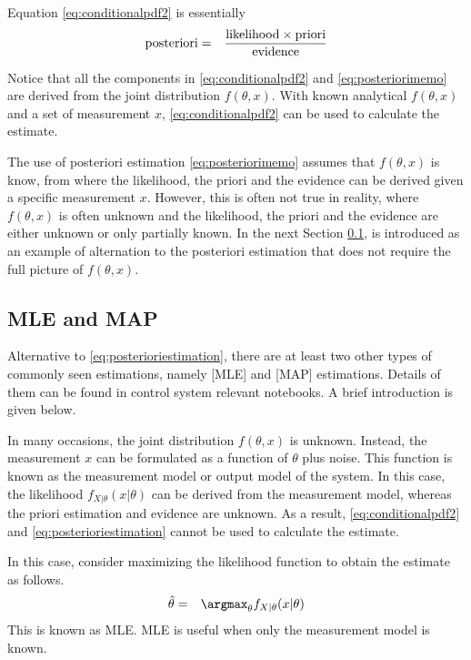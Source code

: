 Equation \eqref{eq:conditionalpdf2} is essentially
\begin{eqnarray}
	\textup{posteriori} &=& \dfrac{\textup{likelihood}\times\textup{priori}}{\textup{evidence}} \label{eq:posteriorimemo}
\end{eqnarray} 

Notice that all the components in \eqref{eq:conditionalpdf2} and \eqref{eq:posteriorimemo} are derived from the joint distribution $f(\theta, x)$. With known analytical $f(\theta, x)$ and a set of measurement $x$, \eqref{eq:conditionalpdf2} can be used to calculate the estimate. 

The use of posteriori estimation \eqref{eq:posteriorimemo} assumes that $f(\theta, x)$ is know, from where the likelihood, the priori and the evidence can be derived given a specific measurement $x$. However, this is often not true in reality, where $f(\theta, x)$ is often unknown and the likelihood, the priori and the evidence are either unknown or only partially known. In the next Section \ref{sec:mlemap},  is introduced as an example of alternation to the posteriori estimation that does not require the full picture of $f(\theta, x)$.

\subsection{MLE and MAP} \label{sec:mlemap}

Alternative to \eqref{eq:posterioriestimation}, there are at least two other types of commonly seen estimations, namely [MLE] and [MAP] estimations. Details of them can be found in control system relevant notebooks. A brief introduction is given below.

In many occasions, the joint distribution $f(\theta, x)$ is unknown. Instead, the measurement $x$ can be formulated as a function of $\theta$ plus noise. This function is known as the measurement model or output model of the system. In this case, the likelihood $f_{X|\theta}(x|\theta)$ can be derived from the measurement model, whereas the priori estimation and evidence are unknown. As a result, \eqref{eq:conditionalpdf2} and \eqref{eq:posterioriestimation} cannot be used to calculate the estimate.

In this case, consider maximizing the likelihood function to obtain the estimate as follows.
\begin{eqnarray}
	\hat{\theta} &=& \argmax_\theta f_{X|\theta}(x|\theta) \nonumber
\end{eqnarray}
This is known as MLE. MLE is useful when only the measurement model is known.

